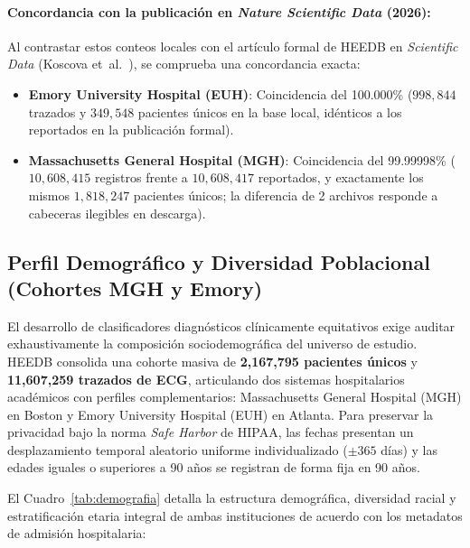 \documentclass[11pt,a4paper]{article}
\begin{document}
\paragraph{Concordancia con la publicación en \textit{Nature Scientific Data} (2026):}
Al contrastar estos conteos locales con el artículo formal de HEEDB en \textit{Scientific Data} (Koscova et~al.~\cite{koscova2024}), se comprueba una concordancia exacta:
\begin{itemize}
    \item \textbf{Emory University Hospital (EUH)}: Coincidencia del 100.000\% ($998{,}844$ trazados y $349{,}548$ pacientes únicos en la base local, idénticos a los reportados en la publicación formal).
    \item \textbf{Massachusetts General Hospital (MGH)}: Coincidencia del 99.99998\% ($10{,}608{,}415$ registros frente a $10{,}608{,}417$ reportados, y exactamente los mismos $1{,}818{,}247$ pacientes únicos; la diferencia de 2 archivos responde a cabeceras ilegibles en descarga).
\end{itemize}

\subsection{Perfil Demográfico y Diversidad Poblacional (Cohortes MGH y Emory)}
El desarrollo de clasificadores diagnósticos clínicamente equitativos exige auditar exhaustivamente la composición sociodemográfica del universo de estudio. HEEDB consolida una cohorte masiva de \textbf{2,167,795 pacientes únicos} y \textbf{11,607,259 trazados de ECG}, articulando dos sistemas hospitalarios académicos con perfiles complementarios: Massachusetts General Hospital (MGH) en Boston y Emory University Hospital (EUH) en Atlanta. Para preservar la privacidad bajo la norma \textit{Safe Harbor} de HIPAA, las fechas presentan un desplazamiento temporal aleatorio uniforme individualizado ($\pm 365$ días) y las edades iguales o superiores a 90 años se registran de forma fija en 90 años.
\newpage

El Cuadro~\ref{tab:demografia} detalla la estructura demográfica, diversidad racial y estratificación etaria integral de ambas instituciones de acuerdo con los metadatos de admisión hospitalaria:
\end{document}
